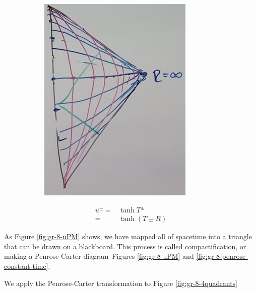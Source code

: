 \documentclass[]{article}
\begin{document}
{\begin{figure}[H]
\begin{center}
\begin{subfigure}[t]{0.3\textwidth}
			\includegraphics[width=\textwidth]{gr-8-penrose-constant-time}
		\end{subfigure}
	\end{center}
\end{figure}

\begin{align*}
	u^\pm =& \tanh T^\pm\\
	=& \tanh (T\pm R)
\end{align*}

As Figure \ref{fig:gr-8-uPM} shows, we have mapped all of spacetime into a triangle that can be drawn on a blackboard. This process is called compactification, or making a Penrose-Carter diagram--Figures \ref{fig:gr-8-uPM} and \ref{fig:gr-8-penrose-constant-time}.

We apply the Penrose-Carter transformation to Figure \ref{fig:gr-8-4quadrants}


}
\end{document}
